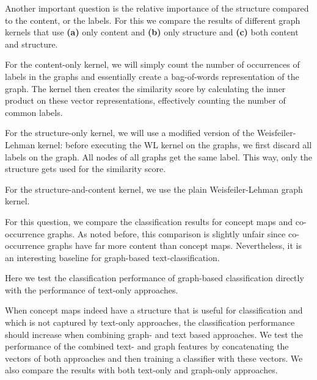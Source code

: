 Another important question is the relative importance of the structure compared to the content, or the labels.
For this we compare the results of different graph kernels that use \textbf{(a)} only content and \textbf{(b)} only structure and \textbf{(c)} both content and structure.

For the content-only kernel, we will simply count the number of occurrences of labels in the graphs and essentially create a bag-of-words representation of the graph. The kernel then creates the similarity score by calculating the inner product on these vector representations, effectively counting the number of common labels.

For the structure-only kernel, we will use a modified version of the Weisfeiler-Lehman kernel: before executing the WL kernel on the graphs, we first discard all labels on the graph. All nodes of all graphs get the same label. This way, only the structure gets used for the similarity score.

For the structure-and-content kernel, we use the plain Weisfeiler-Lehman graph kernel.

For this question, we compare the classification results for concept maps and co-occurrence graphs. As noted before, this comparison is slightly unfair since co-occurrence graphs have far more content than concept maps.
Nevertheless, it is an interesting baseline for graph-based text-classification.

Here we test the classification performance of graph-based classification directly with the performance of text-only approaches.

When concept maps indeed have a structure that is useful for classification and which is not captured by text-only approaches, the classification performance should increase when combining graph- and text based approaches.
We test the performance of the combined text- and graph features by concatenating the vectors of both approaches and then training a classifier with these vectors.
We also compare the results with both text-only and graph-only approaches.

